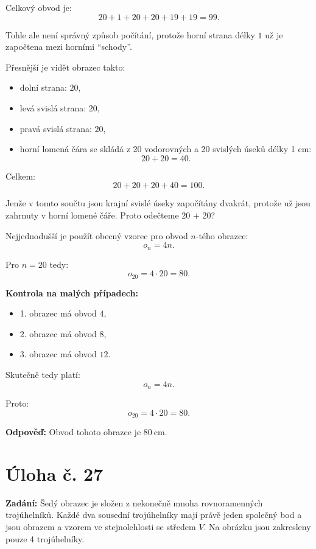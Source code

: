 \documentclass[12pt,a4paper]{article}
\begin{document}
Celkový obvod je:
\[
20+1+20+20+19+19=99.
\]

Tohle ale není správný způsob počítání, protože horní strana délky \(1\) už je započtena mezi horními ``schody''.

Přesnější je vidět obrazec takto:

\begin{itemize}
    \item dolní strana: \(20\),
    \item levá svislá strana: \(20\),
    \item pravá svislá strana: \(20\),
    \item horní lomená čára se skládá z 20 vodorovných a 20 svislých úseků délky 1 cm:
    \[
    20+20=40.
    \]
\end{itemize}

Celkem:
\[
20+20+20+40=100.
\]

Jenže v tomto součtu jsou krajní svislé úseky započítány dvakrát, protože už jsou zahrnuty v horní lomené čáře. Proto odečteme 20 + 20?

Nejjednodušší je použít obecný vzorec pro obvod \(n\)-tého obrazce:
\[
o_n = 4n.
\]

Pro \(n=20\) tedy:
\[
o_{20}=4\cdot 20=80.
\]

\bigskip

\textbf{Kontrola na malých případech:}

\begin{itemize}
    \item 1. obrazec má obvod \(4\),
    \item 2. obrazec má obvod \(8\),
    \item 3. obrazec má obvod \(12\).
\end{itemize}

Skutečně tedy platí:
\[
o_n=4n.
\]

Proto:
\[
o_{20}=4\cdot 20=80.
\]

\bigskip

\textbf{Odpověď:}  
Obvod tohoto obrazce je \(80\ \mathrm{cm}\).



\newpage
\section*{Úloha č. 27}

\textbf{Zadání:}  
Šedý obrazec je složen z nekonečně mnoha rovnoramenných trojúhelníků. Každé dva sousední trojúhelníky mají právě jeden společný bod a jsou obrazem a vzorem ve stejnolehlosti se středem \(V\). Na obrázku jsou zakresleny pouze 4 trojúhelníky.
\end{document}
